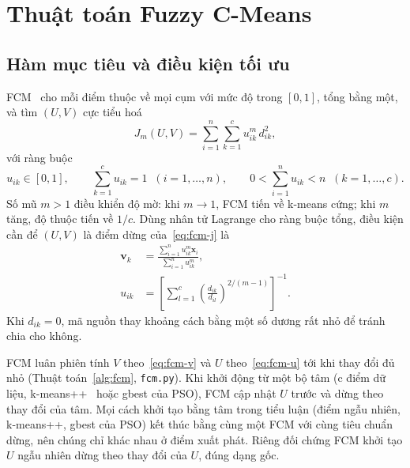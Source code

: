 \section{Thuật toán Fuzzy C-Means}
\label{sec:fcm}

\subsection{Hàm mục tiêu và điều kiện tối ưu}

FCM~\cite{bezdek1981pattern,bezdek1984fcm} cho mỗi điểm thuộc về mọi cụm với mức độ trong $[0, 1]$, tổng bằng một, và tìm
$(U, V)$ cực tiểu hoá
\begin{equation}
  J_m(U, V) = \sum_{i=1}^{n} \sum_{k=1}^{c} u_{ik}^{m} \, d_{ik}^{2},
  \label{eq:fcm-j}
\end{equation}
với ràng buộc
\begin{equation}
  u_{ik} \in [0, 1], \qquad \sum_{k=1}^{c} u_{ik} = 1 \;\; (i = 1, \dots, n), \qquad
  0 < \sum_{i=1}^{n} u_{ik} < n \;\; (k = 1, \dots, c).
  \label{eq:fcm-rang-buoc}
\end{equation}
Số mũ $m > 1$ điều khiển độ mờ: khi $m \to 1$, FCM tiến về k-means cứng; khi $m$ tăng, độ thuộc tiến về $1/c$. Dùng nhân
tử Lagrange cho ràng buộc tổng, điều kiện cần để $(U, V)$ là điểm dừng của~\eqref{eq:fcm-j} là~\cite{bezdek1981pattern}
\begin{align}
  \mathbf{v}_k &= \frac{\sum_{i=1}^{n} u_{ik}^{m} \mathbf{x}_i}{\sum_{i=1}^{n} u_{ik}^{m}}, \label{eq:fcm-v}\\[2pt]
  u_{ik} &= \left[ \sum_{l=1}^{c} \left( \frac{d_{ik}}{d_{il}} \right)^{2/(m-1)} \right]^{-1}. \label{eq:fcm-u}
\end{align}
Khi $d_{ik} = 0$, mã nguồn thay khoảng cách bằng một số dương rất nhỏ để tránh chia cho không.

FCM luân phiên tính $V$ theo~\eqref{eq:fcm-v} và $U$ theo~\eqref{eq:fcm-u} tới khi thay đổi đủ nhỏ
(Thuật toán~\ref{alg:fcm}, \texttt{fcm.py}). Khi khởi động từ một bộ tâm (c điểm dữ liệu, k-means++~\cite{arthur2007kmeanspp} hoặc gbest của PSO),
FCM cập nhật $U$ trước và dừng theo thay đổi của tâm. Mọi cách khởi tạo bằng tâm trong tiểu luận (điểm ngẫu nhiên,
k-means++, gbest của PSO) kết thúc bằng cùng một FCM với cùng tiêu chuẩn dừng, nên chúng chỉ khác nhau ở điểm xuất phát.
Riêng đối chứng FCM khởi tạo $U$ ngẫu nhiên dừng theo thay đổi của $U$, đúng dạng gốc.

